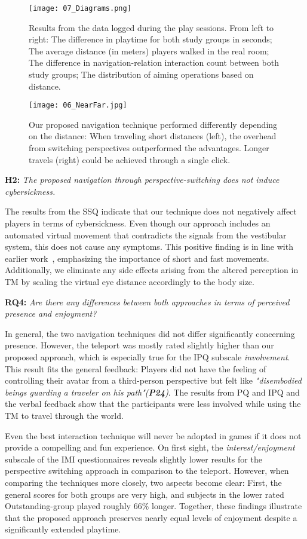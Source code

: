 \documentclass{sigchi}
\begin{document}
\begin{figure*}[t!]
\centering
\texttt{[image: 07\_Diagrams.png]}
\caption{Results from the data logged during the play sessions. From left to right: The difference in playtime for both study groups in seconds; The average distance (in meters) players walked in the real room; The difference in navigation-relation interaction count between both study groups; The distribution of aiming operations based on distance.}
\label{fig:diagram}
\end{figure*}
\begin{figure}
\centering
\texttt{[image: 06\_NearFar.jpg]}
\caption{Our proposed navigation technique performed differently depending on the distance: When traveling short distances (left), the overhead from switching perspectives outperformed the advantages. Longer travels (right) could be achieved through a single click.}
\label{fig:distances}
\end{figure}

\textbf{H2:} \textit{The proposed navigation through perspective-switching does not induce cybersickness.}\par
The results from the SSQ indicate that our technique does not negatively affect players in terms of cybersickness. Even though our approach includes an automated virtual movement that contradicts the signals from the vestibular system, this does not cause any symptoms. This positive finding is in line with earlier work~\cite{krekhov2018gullivr, Habgood:2017:HLP:3130859.3131437}, emphasizing the importance of short and fast movements. Additionally, we eliminate any side effects arising from the altered perception in TM by scaling the virtual eye distance accordingly to the body size.

\textbf{RQ4:} \textit{ Are there any differences between both approaches in terms of perceived presence and enjoyment?}\par
In general, the two navigation techniques did not differ significantly concerning presence. However, the teleport was mostly rated slightly higher than our proposed approach, which is especially true for the IPQ subscale \textit{involvement}. This result fits the general feedback: Players did not have the feeling of controlling their avatar from a third-person perspective but felt like \textit{"disembodied beings guarding a traveler on his path"(\textbf{P24})}. The results from PQ and IPQ and the verbal feedback show that the participants were less involved while using the TM to travel through the world.\par
Even the best interaction technique will never be adopted in games if it does not provide a compelling and fun experience. On first sight, the \textit{interest/enjoyment} subscale of the IMI questionnaires reveals slightly lower results for the perspective switching approach in comparison to the teleport. However, when comparing the techniques more closely, two aspects become clear: First, the general scores for both groups are very high, and subjects in the lower rated Outstanding-group played roughly $66\%$ longer. Together, these findings illustrate that the proposed approach preserves nearly equal levels of enjoyment despite a significantly extended playtime.
\end{document}
